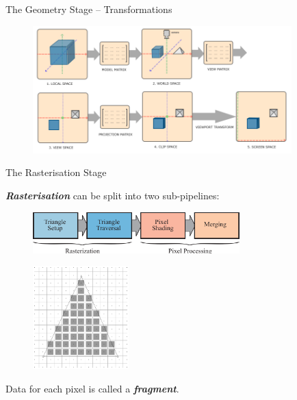 \documentclass{beamer}
\newcommand{\emphbf}[1]{\textbf{\emph{#1}}}
\begin{document}
\begin{frame}{The Geometry Stage -- Transformations}



	\vskip 1cm

	\begin{figure}[t]
		\includegraphics[width=10cm]{coordinate-systems}
		\centering
	\end{figure}

\end{frame}

\begin{frame}{The Rasterisation Stage}

	\emphbf{Rasterisation} can be split into two sub-pipelines:

	\begin{figure}[t]
		\includegraphics[width=8cm]{rasterisation-pipeline}
		\centering
	\end{figure}

	\begin{figure}[t]
		\includegraphics[height=4cm]{fragment}
		\centering
	\end{figure}

	Data for each pixel is called a \emphbf{fragment}.

\end{frame}
\end{document}
